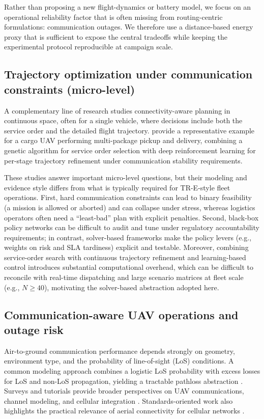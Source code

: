 Rather than proposing a new flight-dynamics or battery model, we focus on an operational reliability factor that is often missing from routing-centric formulations: communication outages. We therefore use a distance-based energy proxy that is sufficient to expose the central tradeoffs while keeping the experimental protocol reproducible at campaign scale.

\subsection{Trajectory optimization under communication constraints (micro-level)}
A complementary line of research studies connectivity-aware planning in continuous space, often for a single vehicle, where decisions include both the service order and the detailed flight trajectory. \citet{huang2026tccn} provide a representative example for a cargo UAV performing multi-package pickup and delivery, combining a genetic algorithm for service order selection with deep reinforcement learning for per-stage trajectory refinement under communication stability requirements.

These studies answer important micro-level questions, but their modeling and evidence style differs from what is typically required for TR-E-style fleet operations. First, hard communication constraints can lead to binary feasibility (a mission is allowed or aborted) and can collapse under stress, whereas logistics operators often need a ``least-bad'' plan with explicit penalties. Second, black-box policy networks can be difficult to audit and tune under regulatory accountability requirements; in contrast, solver-based frameworks make the policy levers (e.g., weights on risk and SLA tardiness) explicit and testable. Moreover, combining service-order search with continuous trajectory refinement and learning-based control introduces substantial computational overhead, which can be difficult to reconcile with real-time dispatching and large scenario matrices at fleet scale (e.g., $N\ge 40$), motivating the solver-based abstraction adopted here.

\subsection{Communication-aware UAV operations and outage risk}
Air-to-ground communication performance depends strongly on geometry, environment type, and the probability of line-of-sight (LoS) conditions. A common modeling approach combines a logistic LoS probability with excess losses for LoS and non-LoS propagation, yielding a tractable pathloss abstraction \citep{alhourani2014,zeng2016}. Surveys and tutorials provide broader perspectives on UAV communications, channel modeling, and cellular integration \citep{khawaja2019,fotouhi2019,mozaffari2019tutorial,zeng2019proc,zeng2019mwc,hayat2020survey}. Standards-oriented work also highlights the practical relevance of aerial connectivity for cellular networks \citep{3gpp36777}.

